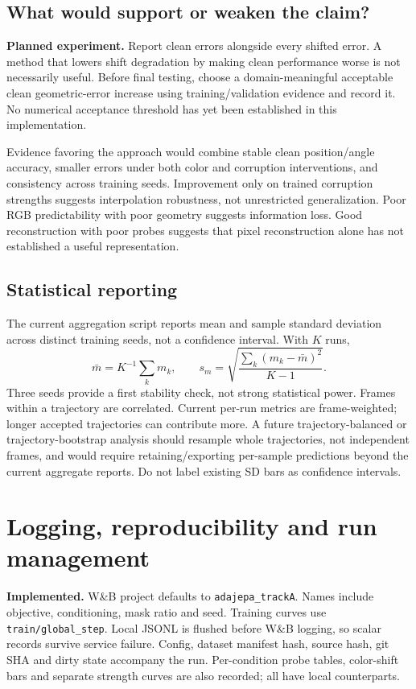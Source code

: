 \documentclass[11pt,a4paper]{article}
\newcommand{\code}[1]{\nolinkurl{#1}}
\newcommand{\impl}{\textbf{Implemented.} }
\newcommand{\plan}{\textbf{Planned experiment.} }
\begin{document}
\subsection{What would support or weaken the claim?}
\plan Report clean errors alongside every shifted error. A method that lowers
shift degradation by making clean performance worse is not necessarily useful.
Before final testing, choose a domain-meaningful acceptable clean geometric-error
increase using training/validation evidence and record it. No numerical acceptance
threshold has yet been established in this implementation.

Evidence favoring the approach would combine stable clean position/angle accuracy,
smaller errors under both color and corruption interventions, and consistency across
training seeds. Improvement only on trained corruption strengths suggests interpolation
robustness, not unrestricted generalization. Poor RGB predictability with poor geometry
suggests information loss. Good reconstruction with poor probes suggests that pixel
reconstruction alone has not established a useful representation.

\subsection{Statistical reporting}
The current aggregation script reports mean and sample standard deviation across
distinct training seeds, not a confidence interval. With $K$ runs,
\begin{equation}
\bar m=K^{-1}\sum_km_k,\qquad
s_m=\sqrt{\frac{\sum_k(m_k-\bar m)^2}{K-1}}.
\end{equation}
Three seeds provide a first stability check, not strong statistical power. Frames
within a trajectory are correlated. Current per-run metrics are frame-weighted;
longer accepted trajectories can contribute more. A future trajectory-balanced or
trajectory-bootstrap analysis should resample whole trajectories, not independent
frames, and would require retaining/exporting per-sample predictions beyond the
current aggregate reports. Do not label existing SD bars as confidence intervals.

\section{Logging, reproducibility and run management}
\impl W\&B project defaults to \code{adajepa_trackA}. Names include objective,
conditioning, mask ratio and seed. Training curves use \code{train/global_step}.
Local JSONL is flushed before W\&B logging, so scalar records survive service
failure. Config, dataset manifest hash, source hash, git SHA and dirty state accompany
the run. Per-condition probe tables, color-shift bars and separate strength curves
are also recorded; all have local counterparts.
\end{document}
